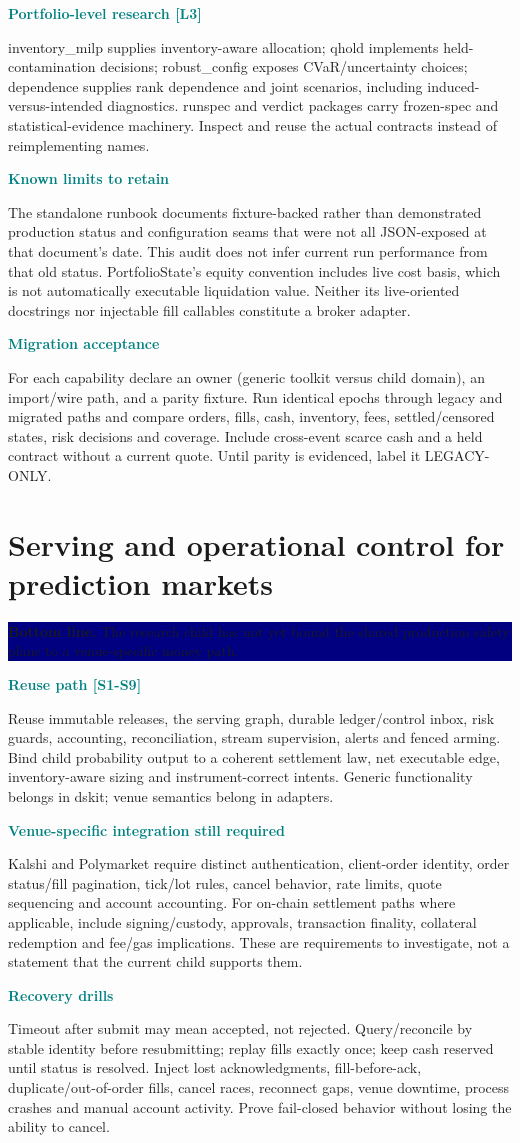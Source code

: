 \documentclass[10pt,letterpaper]{article}
\newcommand{\bl}[1]{\noindent\colorbox{navy}{\parbox{\dimexpr\linewidth-2\fboxsep}{\color{white}\textbf{Bottom line.} #1}}\par\medskip}
\newcommand{\topic}[2]{\clearpage\section{#1}\bl{#2}}
\newcommand{\sub}[1]{\par\textbf{\textcolor{teal}{#1}}\par}
\begin{document}
\sub{Portfolio-level research [L3]}
inventory\_milp supplies inventory-aware allocation; qhold implements held-contamination decisions; robust\_config exposes CVaR/uncertainty choices; dependence supplies rank dependence and joint scenarios, including induced-versus-intended diagnostics. runspec and verdict packages carry frozen-spec and statistical-evidence machinery. Inspect and reuse the actual contracts instead of reimplementing names.
\sub{Known limits to retain}
The standalone runbook documents fixture-backed rather than demonstrated production status and configuration seams that were not all JSON-exposed at that document's date. This audit does not infer current run performance from that old status. PortfolioState's equity convention includes live cost basis, which is not automatically executable liquidation value. Neither its live-oriented docstrings nor injectable fill callables constitute a broker adapter.
\sub{Migration acceptance}
For each capability declare an owner (generic toolkit versus child domain), an import/wire path, and a parity fixture. Run identical epochs through legacy and migrated paths and compare orders, fills, cash, inventory, fees, settled/censored states, risk decisions and coverage. Include cross-event scarce cash and a held contract without a current quote. Until parity is evidenced, label it LEGACY-ONLY.
\topic{Serving and operational control for prediction markets}{The research child has not yet bound the shared production safety plane to a venue-specific money path.}
\sub{Reuse path [S1-S9]}
Reuse immutable releases, the serving graph, durable ledger/control inbox, risk guards, accounting, reconciliation, stream supervision, alerts and fenced arming. Bind child probability output to a coherent settlement law, net executable edge, inventory-aware sizing and instrument-correct intents. Generic functionality belongs in dskit; venue semantics belong in adapters.
\sub{Venue-specific integration still required}
Kalshi and Polymarket require distinct authentication, client-order identity, order status/fill pagination, tick/lot rules, cancel behavior, rate limits, quote sequencing and account accounting. For on-chain settlement paths where applicable, include signing/custody, approvals, transaction finality, collateral redemption and fee/gas implications. These are requirements to investigate, not a statement that the current child supports them.
\sub{Recovery drills}
Timeout after submit may mean accepted, not rejected. Query/reconcile by stable identity before resubmitting; replay fills exactly once; keep cash reserved until status is resolved. Inject lost acknowledgments, fill-before-ack, duplicate/out-of-order fills, cancel races, reconnect gaps, venue downtime, process crashes and manual account activity. Prove fail-closed behavior without losing the ability to cancel.
\end{document}
